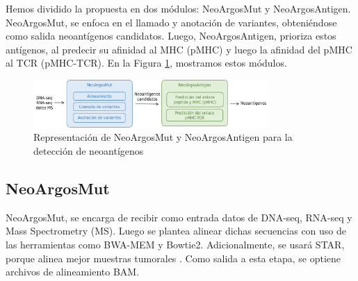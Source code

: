 \documentclass[a4paper,11pt]{article}
\begin{document}
Hemos dividido la propuesta en dos módulos: NeoArgosMut y NeoArgosAntigen. NeoArgosMut, se enfoca en el llamado y anotación de variantes, obteniéndose como salida neoantígenos candidatos. Luego, NeoArgosAntigen, prioriza estos antígenos, al predecir su afinidad al MHC (pMHC) y luego la afinidad del pMHC al TCR (pMHC-TCR). En la Figura \ref{fig:pipeline}, mostramos estos módulos. 



\begin{figure}[h]	
		\centering
		\includegraphics[width=0.8\textwidth]{../img/pipeline/proposal_pipeline}	
	\caption{Representación de NeoArgosMut y NeoArgosAntigen para la detección de neoantígenos}
	\label{fig:pipeline}
\end{figure}


\subsection{NeoArgosMut}


NeoArgosMut, se encarga de recibir como entrada datos de DNA-seq, RNA-seq y Mass Spectrometry (MS). Luego se plantea alinear dichas secuencias con uso de las herramientas como BWA-MEM y Bowtie2. Adicionalmente, se usará STAR, porque alinea mejor muestras tumorales \citep{rubinsteyn2018computational}. Como salida a esta etapa, se optiene archivos de alineamiento BAM.


\end{document}
